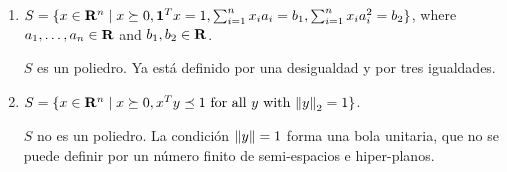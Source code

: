 \begin{enumerate}[label=(\alph*)]
\item $S = \{x \in \mathbf{R}^n \mid x \succeq 0, \mathbf{1}^Tx = 1,
    \sum_{i=1}^n x_i a_i = b_1, \sum_{i=1}^n x_i a^2_i = b_2\}$,
    where $a_1, \dots, a_n \in \mathbf{R}$ and $b_1, b_2 \in \mathbf{R}$.

    $S$ es un poliedro. Ya está definido por una desigualdad y por tres igualdades.

\item $S = \{x \in \mathbf{R}^n \mid x \succeq 0, x^Ty \preceq 1 \text{ for all } y \text{ with } \norm{y}_2 = 1\}$.

    $S$ no es un poliedro. La condición $\norm{y} = 1$ forma una bola unitaria,
    que no se puede definir por un número finito de semi-espacios e hiper-planos.


\end{enumerate}

